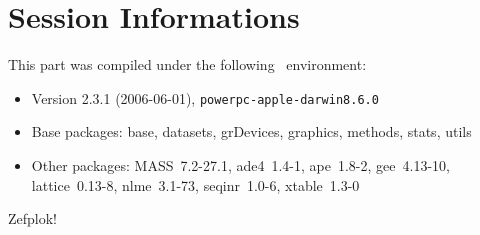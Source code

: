 \documentclass{article}
\begin{document}
\section{Session Informations}

This part was compiled under the following \Rlogo{}~environment:

\begin{itemize}
  \item Version 2.3.1 (2006-06-01), \verb|powerpc-apple-darwin8.6.0|
  \item Base packages: base, datasets, grDevices, graphics, methods,
    stats, utils
  \item Other packages: MASS~7.2-27.1, ade4~1.4-1, ape~1.8-2,
    gee~4.13-10, lattice~0.13-8, nlme~3.1-73, seqinr~1.0-6,
    xtable~1.3-0
\end{itemize}
Zefplok!
%
%
\clearpage
{}


\end{document}
